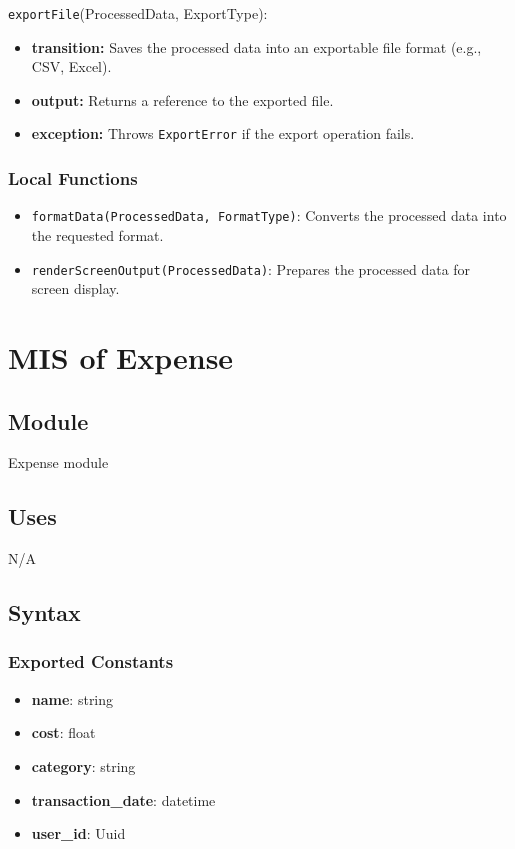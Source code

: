 \documentclass[12pt, titlepage]{article}
\begin{document}
\noindent \texttt{exportFile}(ProcessedData, ExportType):
\begin{itemize}
    \item \textbf{transition:} Saves the processed data into an exportable file format (e.g., CSV, Excel).
    \item \textbf{output:} Returns a reference to the exported file.
    \item \textbf{exception:} Throws \texttt{ExportError} if the export operation fails.
\end{itemize}

\subsubsection{Local Functions}

\begin{itemize}
    \item \texttt{formatData(ProcessedData, FormatType)}: Converts the processed data into the requested format.
    \item \texttt{renderScreenOutput(ProcessedData)}: Prepares the processed data for screen display.
\end{itemize}

\newpage


\section{MIS of Expense}\label{expense_module}

\subsection{Module}

Expense module

\subsection{Uses}
N/A

\subsection{Syntax}

\subsubsection{Exported Constants}
\begin{itemize}
  \item \textbf{name}: string
  \item \textbf{cost}: float
  \item \textbf{category}: string
  \item \textbf{transaction\_date}: datetime
  \item \textbf{user\_id}: Uuid
\end{itemize}
\end{document}
